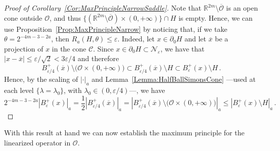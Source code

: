 \documentclass[12pt,reqno]{amsart}
\theoremstyle{definition}
\theoremstyle{remark}
\newcommand{\con}[1]{\mathbb{#1}}
\newcommand{\R}{\con{R}} %
\newcommand{\ccal}{\mathscr{C}}
\newcommand{\ncal}{\mathcal{N}}
\newcommand{\ocal}{\mathcal{O}}
\numberwithin{equation}{section}
\begin{document}
\begin{proof}[Proof of Corollary~\ref{Cor:MaxPrincipleNarrowSaddle}]
Note that $\R^{2m} \setminus \overline{\ocal}$ is an open cone outside $\ocal$, and thus $\{ (\R^{2m} \setminus \overline{\ocal}) \times (0, +\infty) \} \cap H $ is empty. Hence, we can use Proposition~\ref{Prop:MaxPrincipleNarrow} by noticing that,  if we take $\theta = 2^{-4m - 3-2a}$, then $R_a(H,\theta)\leq \varepsilon$. Indeed, let $x\in \partial_0 H$ and let $\overline{x}$ be a projection of $x$ in the cone $\ccal$. Since $x\in \partial_0 H \subset \ncal_\varepsilon$, we have that $|x-\overline{x}| \leq \varepsilon /\sqrt{2} < 3\varepsilon /4$ and therefore
$$
B_{\varepsilon/4}^+ (\overline{x})\setminus \big( \ocal \times (0, +\infty)\big) \subset B_{\varepsilon/4}^+ (\overline{x})\setminus H \subset B_\varepsilon^+ (x)\setminus H\,.
$$
Hence, by the scaling of $|\cdot|_a$ and Lemma~\ref{Lemma:HalfBallSimonsCone} ---used at each level $\{\lambda = \lambda_0\}$, with $\lambda_0\in (0,\varepsilon/4)$---, we have
$$
2^{-4m - 3-2a} |B^+_\varepsilon (x)|_a = \dfrac{1}{2} |B_{\varepsilon/4}^+(\overline{x}) |_a = |B_{\varepsilon/4}^+ (\overline{x})\setminus \big( \ocal \times (0, +\infty)\big)  |_a \leq |B_\varepsilon^+ (x)\setminus H |_a\,.
$$
\end{proof}


With this result at hand we can now establish the maximum principle for the linearized operator in $\ocal$.
\end{document}
